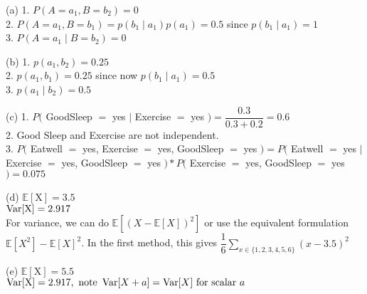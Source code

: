 \solution

(a) 1. $P\left(A=a_1, B=b_2\right)=0$ \\
2. $P\left(A=a_1, B=b_1\right)=p\left(b_1 \mid a_1\right) p\left(a_1\right)=0.5$ since $p\left(b_1 \mid a_1\right)=1$ \\
3. $P\left(A=a_1 \mid B=b_2\right)=0$

(b) 1. $p\left(a_1, b_2\right)=0.25$ \\
2. $p\left(a_1, b_1\right)=0.25$ since now $p\left(b_1 \mid a_1\right)=0.5$ \\
3. $p\left(a_1 \mid b_2\right)=0.5$

(c) 1. $P($ GoodSleep $=$ yes $\mid$ Exercise $=$ yes $)=\dfrac{0.3}{0.3+0.2}=0.6$ \\
2. Good Sleep and Exercise are not independent. \\
3. $P($ Eatwell $=$ yes, Exercise $=$ yes, GoodSleep $=$ yes $)=P($ Eatwell $=$ yes $|$ Exercise $=$ yes, GoodSleep $=$ yes $) * P($ Exercise $=$ yes, GoodSleep $=$ yes $)=0.075$

(d) $\mathbb{E}[\mathrm{X}]=3.5$ \\
$\operatorname{Var}[\mathrm{X}]=2.917$ \\
For variance, we can do $\mathbb{E}\left[(X-\mathbb{E}[X])^2\right]$ or use the equivalent formulation $\mathbb{E}\left[X^2\right]-\mathbb{E}[X]^2$. In the first method, this gives $\dfrac{1}{6} \sum\limits_{x \in\{1,2,3,4,5,6\}}(x-3.5)^2$

(e) $\mathbb{E}[\mathrm{X}]=5.5$ \\
$\operatorname{Var}[\mathrm{X}]=2.917, \text { note } \operatorname{Var}[X+a]=\operatorname{Var}[X] \text { for scalar } a$

\newpage